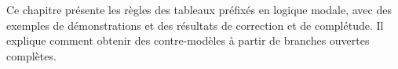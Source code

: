 \documentclass[../../../include/open-logic-chapter]{subfiles}
\begin{document}

Ce chapitre présente les règles des tableaux préfixés en logique modale,
avec des exemples de démonstrations et des résultats de correction et de
complétude. Il explique comment obtenir des contre-modèles à partir de
branches ouvertes complètes.


\OLEndChapterHook
\end{document}
